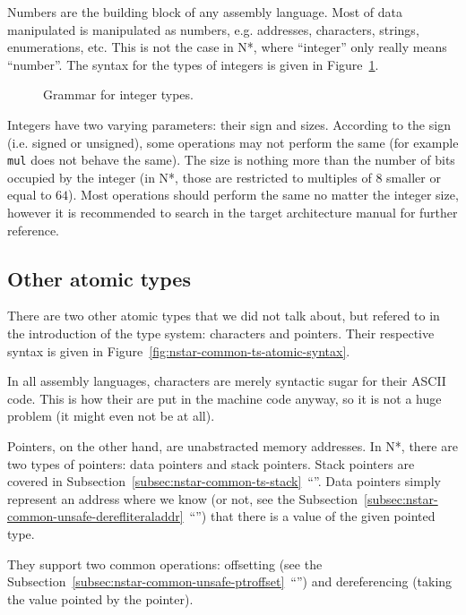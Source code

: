 Numbers are the building block of any assembly language. Most of data manipulated is manipulated as numbers, e.g. addresses, characters, strings, enumerations, etc.
This is not the case in N*, where ``integer''  only really means ``number''.
The syntax for the types of integers is given in Figure~\ref{fig:nstar-common-ts-integer-syntax}.

\begin{figure}[htb]
  \centering
  \caption{Grammar for integer types.}
  \label{fig:nstar-common-ts-integer-syntax}
\end{figure}

Integers have two varying parameters: their sign and sizes.
According to the sign (i.e. signed or unsigned), some operations may not perform the same (for example \texttt{mul} does not behave the same).
The size is nothing more than the number of bits occupied by the integer (in N*, those are restricted to multiples of $8$ smaller or equal to $64$).
Most operations should perform the same no matter the integer size, however it is recommended to search in the target architecture manual for further reference.

\subsection{Other atomic types}\label{subsec:nstar-common-ts-otheratomic}

There are two other atomic types that we did not talk about, but refered to in the introduction of the type system: characters and pointers. Their respective syntax is given in Figure~\ref{fig:nstar-common-ts-atomic-syntax}.

In all assembly languages, characters are merely syntactic sugar for their ASCII code. This is how their are put in the machine code anyway, so it is not a huge problem (it might even not be at all).

Pointers, on the other hand, are unabstracted memory addresses.
In N*, there are two types of pointers: data pointers and stack pointers.
Stack pointers are covered in Subsection~\ref{subsec:nstar-common-ts-stack}~``''.
Data pointers simply represent an address where we know (or not, see the Subsection~\ref{subsec:nstar-common-unsafe-derefliteraladdr}~``'') that there is a value of the given pointed type.

They support two common operations: offsetting (see the Subsection~\ref{subsec:nstar-common-unsafe-ptroffset}~``'') and dereferencing (taking the value pointed by the pointer).

